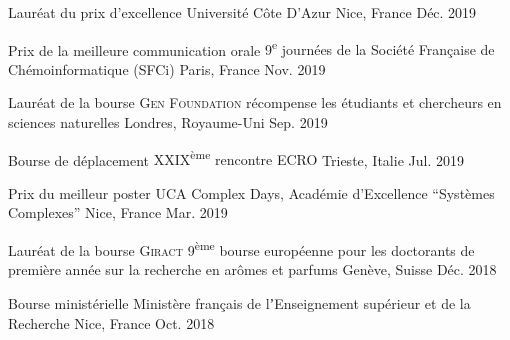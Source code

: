 
\begin{cvhonors}

  \cvhonor
  	{Lauréat du prix d'excellence}
  	{Université Côte D'Azur}
  	{Nice, France}
  	{Déc. 2019}

  \cvhonor
  	{Prix de la meilleure communication orale}
  	{9\textsuperscript{e} journées de la Société Française de Chémoinformatique (SFCi)}
  	{Paris, France}
  	{Nov. 2019}

  \cvhonor
  	{Lauréat de la bourse \textsc{Gen Foundation}}
  	{récompense les étudiants et chercheurs en sciences naturelles}
  	{Londres, Royaume-Uni}
  	{Sep. 2019}

  \cvhonor
  	{Bourse de déplacement}
  	{\textsc{XXIX}\textsuperscript{ème} rencontre \textsc{ECRO}}
  	{Trieste, Italie}
  	{Jul. 2019}

  \cvhonor
  	{Prix du meilleur poster}
  	{UCA Complex Days, Académie d'Excellence ``Systèmes Complexes''}
  	{Nice, France}
  	{Mar. 2019}

  \cvhonor
  	{Lauréat de la bourse \textsc{Giract}}
  	{9\textsuperscript{ème} bourse européenne pour les doctorants de première année sur la recherche en arômes et parfums}
  	{Genève, Suisse}
  	{Déc. 2018}

  \cvhonor
  	{Bourse ministérielle}
  	{Ministère français de lʼEnseignement supérieur et de la Recherche}
  	{Nice, France}
  	{Oct. 2018}

\end{cvhonors}
